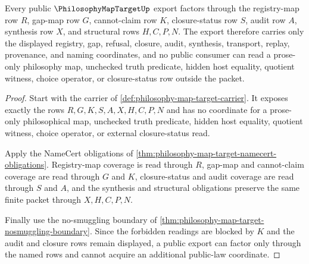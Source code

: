 \begin{theorem}
\label{thm:philosophy-map-target-public-law-boundary}
Every public $\PhilosophyMapTargetUp$ export factors through the registry-map row $R$, gap-map row $G$, cannot-claim row $K$, closure-status row $S$, audit row $A$, synthesis row $X$, and structural rows $H,C,P,N$. The export therefore carries only the displayed registry, gap, refusal, closure, audit, synthesis, transport, replay, provenance, and naming coordinates, and no public consumer can read a prose-only philosophy map, unchecked truth predicate, hidden host equality, quotient witness, choice operator, or closure-status row outside the packet.
\end{theorem}
\begin{proof}
Start with the carrier of \autoref{def:philosophy-map-target-carrier}. It exposes exactly the rows $R,G,K,S,A,X,H,C,P,N$ and has no coordinate for a prose-only philosophical map, unchecked truth predicate, hidden host equality, quotient witness, choice operator, or external closure-status read.

Apply the NameCert obligations of \autoref{thm:philosophy-map-target-namecert-obligations}. Registry-map coverage is read through $R$, gap-map and cannot-claim coverage are read through $G$ and $K$, closure-status and audit coverage are read through $S$ and $A$, and the synthesis and structural obligations preserve the same finite packet through $X,H,C,P,N$.

Finally use the no-smuggling boundary of \autoref{thm:philosophy-map-target-nosmuggling-boundary}. Since the forbidden readings are blocked by $K$ and the audit and closure rows remain displayed, a public export can factor only through the named rows and cannot acquire an additional public-law coordinate.
\end{proof}



